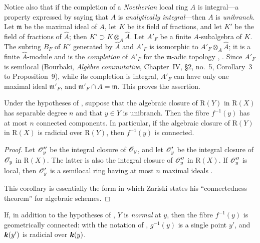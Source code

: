 Notice also that if the completion of a \emph{Noetherian} local ring $A$ is
integral---a property expressed by saying that $A$ is
\emph{analytically integral}---then $A$ is \emph{unibranch}.  Let
$\mathfrak{m}$ be the maximal ideal of $A$, let $K$ be its field of
fractions, and let $K'$ be the field of fractions of $\widehat{A}$;
then $K'\supset K\otimes_A\widehat{A}$.
Let $A'_F$ be a finite $A$-subalgebra of $K$.  The subring $B_F$ of
$K'$ generated by $\widehat{A}$ and $A'_F$ is isomorphic to $A'_F\otimes_A\widehat{A}$;
it is a finite $\widehat{A}$-module and is the \emph{completion} of $A'_F$
for the $\mathfrak{m}$-adic topology
, .  Since $A'_F$ is semilocal
(Bourbaki, \emph{Alg\`ebre commutative}, Chapter~IV, \S2, no.~5,
Corollary~3 to Proposition~9), while its completion is integral,
$A'_F$ can have only one maximal ideal $\mathfrak{m}'_F$, and
$\mathfrak{m}'_F\cap A=\mathfrak{m}$.  This proves the assertion.

\begin{corollary}[4.3.7]
\label{III.4.3.7}
Under the hypotheses of , suppose that the algebraic
closure of $\mathrm{R}(Y)$ in $\mathrm{R}(X)$ has separable degree $n$ and that
$y\in Y$ is unibranch.  Then the fibre $f^{-1}(y)$ has at most $n$
connected components.  In particular, if the algebraic closure of
$\mathrm{R}(Y)$ in $\mathrm{R}(X)$ is radicial over $\mathrm{R}(Y)$, then $f^{-1}(y)$ is
connected.
\end{corollary}

\begin{proof}
Let $\mathscr{O}''_y$ be the integral closure of $\mathscr{O}_y$, and let
$\mathscr{O}'_y$ be the integral closure of $\mathscr{O}_y$ in $\mathrm{R}(X)$.
The latter is also the integral closure of $\mathscr{O}''_y$ in $\mathrm{R}(X)$.
If $\mathscr{O}''_y$ is local, then $\mathscr{O}'_y$ is a semilocal ring
having at most $n$ maximal ideals
\cite[vol.~I, p.~289, Theorem~22]{I-13}.

This corollary is essentially the form in which Zariski states his
``connectedness theorem'' for algebraic schemes.
\end{proof}

\begin{remark}[4.3.8]
\label{III.4.3.8}
If, in addition to the hypotheses of , $Y$ is
\emph{normal} at $y$, then the fibre $f^{-1}(y)$ is geometrically
connected: with the notation of , $g^{-1}(y)$ is a
single point $y'$, and $\boldsymbol{k}(y')$ is radicial over $\boldsymbol{k}(y)$.
\end{remark}

